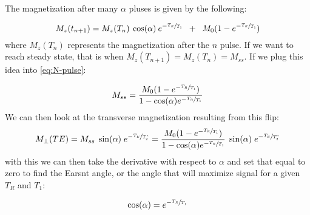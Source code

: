 The magnetization after many $\alpha$ pluses is given by the following:

\begin{equation}
M_z(t_{n+1}) = M_z(T_n) \: \cos(\alpha)\: e^{-\sfrac{T_R}{T_1}} \; \; + \; \; M_0 (1-e^{-\sfrac{T_R}{T_1}})
\label{eq:N-pulse}
\end{equation}
where $M_z(T_n)$ represents the magnetization after the $n$ pulse. If we want to reach steady state, that is when $M_z(T_{n+1})=M_z(T_n)=M_{ss}$. If we plug this idea into \ref{eq:N-pulse}:

\begin{equation}
M_{ss} = \frac{M_0 (1-e^{-\sfrac{T_R}{T_1}})}{1-\cos(\alpha)e^{-\sfrac{T_R}{T_1}}}
\end{equation}
We can then look at the transverse magnetization resulting from this flip:
\begin{equation}
M_{\perp}(TE) = M_{ss} \; \sin(\alpha)\;e^{-\sfrac{T_E}{T_2^*}}= \frac{M_0 (1-e^{-\sfrac{T_R}{T_1}})}{1-\cos(\alpha)e^{-\sfrac{T_R}{T_1}}} \; \sin(\alpha)\; e^{-\sfrac{T_E}{T_2^*}}
\end{equation}
with this we can then take the derivative with respect to $\alpha$ and set that equal to zero to find the Earsnt angle, or the angle that will maximize signal for a given $T_R$ and $T_1$:

\begin{equation}
\cos(\alpha) = e^{-\sfrac{T_R}{T_1}}
\end{equation}

